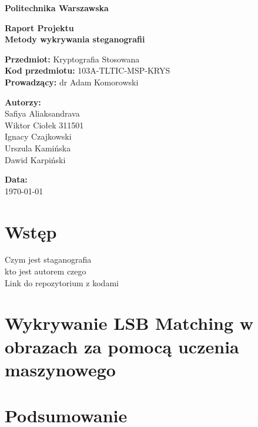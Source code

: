 \documentclass[a4paper,12pt]{article}
\begin{document}
\begin{titlepage}
    \begin{center}
        \vspace*{1cm}
        
        \textbf{\Huge Politechnika Warszawska}\\
        \vspace{2cm}
        
        \textbf{\LARGE Raport Projektu}\\
        \vspace{0.5cm}
        \textbf{\Large Metody wykrywania steganografii}\\
        
        \vspace{2cm}
        
        \textbf{Przedmiot:} Kryptografia Stosowana \\
        \textbf{Kod przedmiotu:} 103A-TLTIC-MSP-KRYS \\
        \textbf{Prowadzący:} dr Adam Komorowski \\
        
        \vfill
        
        \textbf{Autorzy:}\\
        \vspace{0.5cm}
        Safiya Aliaksandrava\\
        Wiktor Ciołek 311501\\
        Ignacy Czajkowski\\
        Urszula Kamińska\\
        Dawid Karpiński\\
        
        \vspace{1cm}
        
        \textbf{Data:} \\
        \today
        
        \vspace{2cm}
    \end{center}
\end{titlepage}

\section{Wstęp}
Czym jest staganografia\\
kto jest autorem czego\\
Link do repozytorium z kodami

\section{Wykrywanie LSB Matching w obrazach za pomocą uczenia maszynowego}
    
        
\section{Podsumowanie}

\printbibliography[title={Źródła}] %
\end{document}
